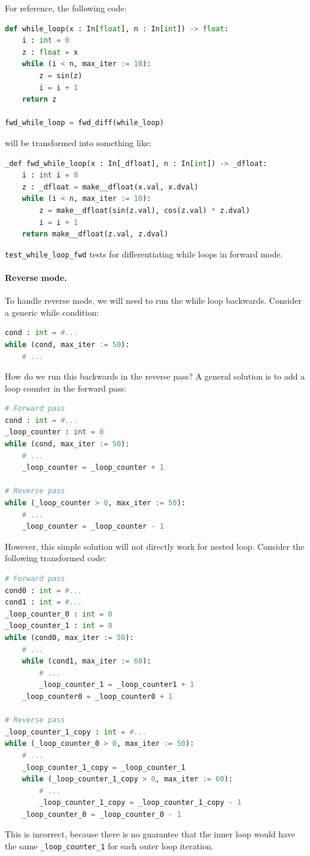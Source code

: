 For reference, the following code:
\begin{lstlisting}[language=Python]
def while_loop(x : In[float], n : In[int]) -> float:
    i : int = 0
    z : float = x
    while (i < n, max_iter := 10):
        z = sin(z)
        i = i + 1
    return z

fwd_while_loop = fwd_diff(while_loop)
\end{lstlisting}
will be transformed into something like:
\begin{lstlisting}[language=Python]
_def fwd_while_loop(x : In[_dfloat], n : In[int]) -> _dfloat:
    i : int i = 0
    z : _dfloat = make__dfloat(x.val, x.dval)
    while (i < n, max_iter := 10):
        z = make__dfloat(sin(z.val), cos(z.val) * z.dval)
        i = i + 1
    return make__dfloat(z.val, z.dval)
\end{lstlisting}

\lstinline{test_while_loop_fwd} tests for differentiating while loops in forward mode.

\paragraph{Reverse mode.} To handle reverse mode, we will need to run the while loop backwards. Consider a generic while condition:
\begin{lstlisting}[language=Python]
cond : int = #...
while (cond, max_iter := 50):
    # ...
\end{lstlisting}
How do we run this backwards in the reverse pass? A general solution is to add a loop counter in the forward pass:
\begin{lstlisting}[language=Python]
# Forward pass
cond : int = #...
_loop_counter : int = 0
while (cond, max_iter := 50):
    # ...
    _loop_counter = _loop_counter + 1

# Reverse pass
while (_loop_counter > 0, max_iter := 50):
    # ...
    _loop_counter = _loop_counter - 1
\end{lstlisting}
However, this simple solution will not directly work for nested loop. Consider the following transformed code:
\begin{lstlisting}[language=Python]
# Forward pass
cond0 : int = #...
cond1 : int = #...
_loop_counter_0 : int = 0
_loop_counter_1 : int = 0
while (cond0, max_iter := 50):
    # ...
    while (cond1, max_iter := 60):
        # ...
        _loop_counter_1 = _loop_counter1 + 1
    _loop_counter0 = _loop_counter0 + 1

# Reverse pass
_loop_counter_1_copy : int = #...
while (_loop_counter_0 > 0, max_iter := 50):
    # ...
    _loop_counter_1_copy = _loop_counter_1
    while (_loop_counter_1_copy > 0, max_iter := 60):
        # ...
        _loop_counter_1_copy = _loop_counter_1_copy - 1
    _loop_counter_0 = _loop_counter_0 - 1
\end{lstlisting}
This is incorrect, because there is no guarantee that the inner loop would have the same \lstinline{_loop_counter_1} for each outer loop iteration.

